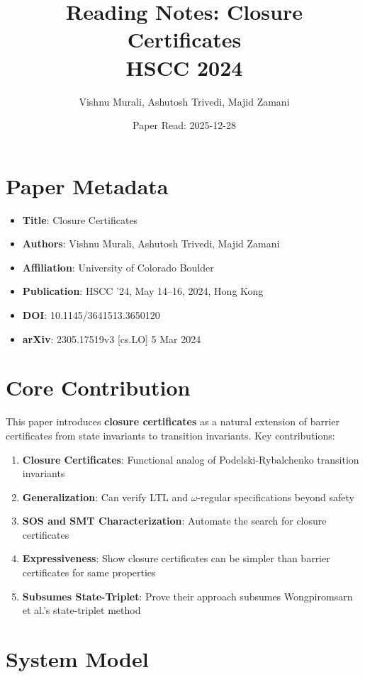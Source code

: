 \documentclass{article}
\title{Reading Notes: Closure Certificates\\
HSCC 2024}
\author{Vishnu Murali, Ashutosh Trivedi, Majid Zamani}
\date{Paper Read: 2025-12-28}
\begin{document}
\maketitle

\section{Paper Metadata}

\begin{itemize}
    \item \textbf{Title}: Closure Certificates
    \item \textbf{Authors}: Vishnu Murali, Ashutosh Trivedi, Majid Zamani
    \item \textbf{Affiliation}: University of Colorado Boulder
    \item \textbf{Publication}: HSCC '24, May 14–16, 2024, Hong Kong
    \item \textbf{DOI}: 10.1145/3641513.3650120
    \item \textbf{arXiv}: 2305.17519v3 [cs.LO] 5 Mar 2024
\end{itemize}

\section{Core Contribution}

This paper introduces \textbf{closure certificates} as a natural extension of barrier certificates from state invariants to transition invariants. Key contributions:

\begin{enumerate}
    \item \textbf{Closure Certificates}: Functional analog of Podelski-Rybalchenko transition invariants
    \item \textbf{Generalization}: Can verify LTL and $\omega$-regular specifications beyond safety
    \item \textbf{SOS and SMT Characterization}: Automate the search for closure certificates
    \item \textbf{Expressiveness}: Show closure certificates can be simpler than barrier certificates for same properties
    \item \textbf{Subsumes State-Triplet}: Prove their approach subsumes Wongpiromsarn et al.'s state-triplet method
\end{enumerate}

\section{System Model}
\end{document}
